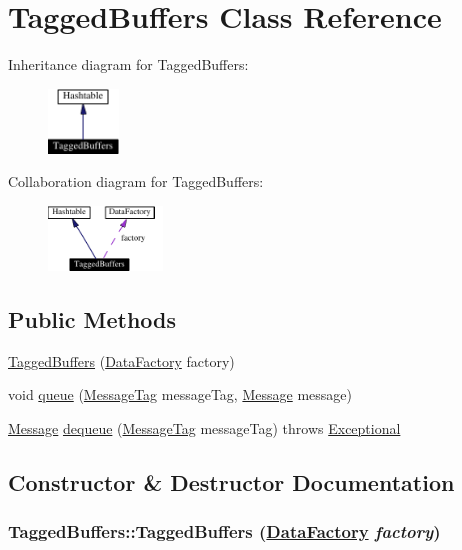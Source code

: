 \hypertarget{classTaggedBuffers}{
\section{Tagged\-Buffers  Class Reference}
\label{classTaggedBuffers}
}
Inheritance diagram for Tagged\-Buffers:\begin{figure}[H]
\begin{center}
\leavevmode
\includegraphics[width=53pt]{classTaggedBuffers__inherit__graph}
\end{center}
\end{figure}
Collaboration diagram for Tagged\-Buffers:\begin{figure}[H]
\begin{center}
\leavevmode
\includegraphics[width=86pt]{classTaggedBuffers__coll__graph}
\end{center}
\end{figure}
\subsection*{Public Methods}
\begin{CompactItemize}
\item 
\hyperlink{classTaggedBuffers_a0}{Tagged\-Buffers} (\hyperlink{interfaceDataFactory}{Data\-Factory} factory)
\item 
void \hyperlink{classTaggedBuffers_a1}{queue} (\hyperlink{interfaceMessageTag}{Message\-Tag} message\-Tag, \hyperlink{interfaceMessage}{Message} message)
\item 
\hyperlink{interfaceMessage}{Message} \hyperlink{classTaggedBuffers_a2}{dequeue} (\hyperlink{interfaceMessageTag}{Message\-Tag} message\-Tag) throws \hyperlink{classExceptional}{Exceptional}
\end{CompactItemize}


\subsection{Constructor \& Destructor Documentation}
\hypertarget{classTaggedBuffers_a0}{
\subsubsection[TaggedBuffers]{\setlength{\rightskip}{0pt plus 5cm}Tagged\-Buffers::Tagged\-Buffers (\hyperlink{interfaceDataFactory}{Data\-Factory} {\em factory})}}
\label{classTaggedBuffers_a0}





